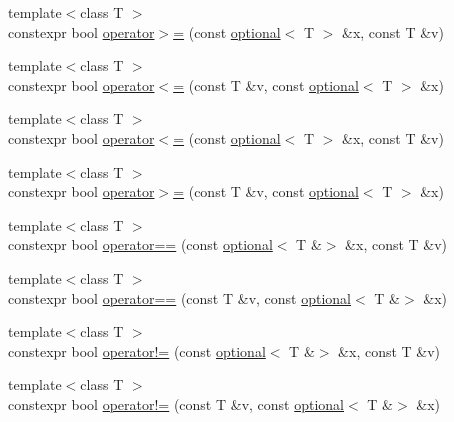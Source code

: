 \begin{DoxyCompactItemize}
{\footnotesize template$<$class T $>$ }\\constexpr bool \hyperlink{namespacestd_1_1experimental_a3209ada3ae8542ffbdfcc7e7d35f19a5}{operator$>$=} (const \hyperlink{classstd_1_1experimental_1_1optional}{optional}$<$ T $>$ \&x, const T \&v)
\item 
{\footnotesize template$<$class T $>$ }\\constexpr bool \hyperlink{namespacestd_1_1experimental_a4482ae3dc6aad99b5d17a3a2c0dfe30f}{operator$<$=} (const T \&v, const \hyperlink{classstd_1_1experimental_1_1optional}{optional}$<$ T $>$ \&x)
\item 
{\footnotesize template$<$class T $>$ }\\constexpr bool \hyperlink{namespacestd_1_1experimental_a9dd11e02b37f5d3e9c09a29c7ea7024c}{operator$<$=} (const \hyperlink{classstd_1_1experimental_1_1optional}{optional}$<$ T $>$ \&x, const T \&v)
\item 
{\footnotesize template$<$class T $>$ }\\constexpr bool \hyperlink{namespacestd_1_1experimental_a0e2303b05ab975b9dd1a53c198bf2e45}{operator$>$=} (const T \&v, const \hyperlink{classstd_1_1experimental_1_1optional}{optional}$<$ T $>$ \&x)
\item 
{\footnotesize template$<$class T $>$ }\\constexpr bool \hyperlink{namespacestd_1_1experimental_a5e8049d714e136368d3f1cc2cc7fc787}{operator==} (const \hyperlink{classstd_1_1experimental_1_1optional}{optional}$<$ T \&$>$ \&x, const T \&v)
\item 
{\footnotesize template$<$class T $>$ }\\constexpr bool \hyperlink{namespacestd_1_1experimental_ad874f9e082998b503ad0f7bb0376782e}{operator==} (const T \&v, const \hyperlink{classstd_1_1experimental_1_1optional}{optional}$<$ T \&$>$ \&x)
\item 
{\footnotesize template$<$class T $>$ }\\constexpr bool \hyperlink{namespacestd_1_1experimental_a32e202bafe91eccccc3d34ef53bc3f01}{operator!=} (const \hyperlink{classstd_1_1experimental_1_1optional}{optional}$<$ T \&$>$ \&x, const T \&v)
\item 
{\footnotesize template$<$class T $>$ }\\constexpr bool \hyperlink{namespacestd_1_1experimental_aa2bc218261382e5d1dbb90aee5930580}{operator!=} (const T \&v, const \hyperlink{classstd_1_1experimental_1_1optional}{optional}$<$ T \&$>$ \&x)
\item 

\end{DoxyCompactItemize}
